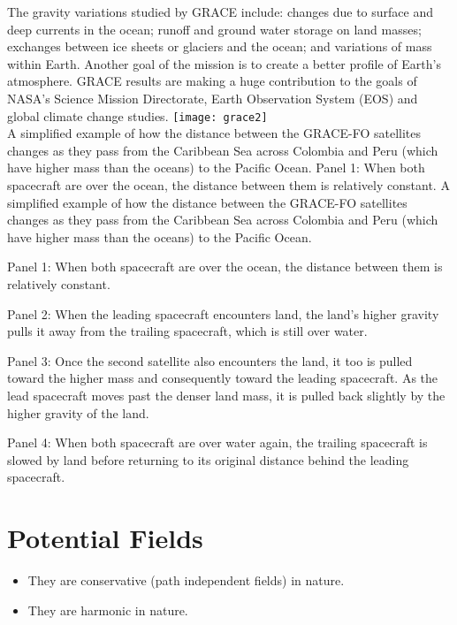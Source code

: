\documentclass[a4paper,12pt]{article}
\begin{document}
The gravity variations studied by GRACE include: changes due to surface and deep currents in the ocean; runoff and ground water storage on land masses; exchanges between ice sheets or glaciers and the ocean; and variations of mass within Earth. Another goal of the mission is to create a better profile of Earth's atmosphere. GRACE results are making a huge contribution to the goals of NASA's Science Mission Directorate, Earth Observation System (EOS) and global climate change studies.
\newpage
\texttt{[image: grace2]}
\\
A simplified example of how the distance between the GRACE-FO satellites changes as they pass from the Caribbean Sea across Colombia and Peru (which have higher mass than the oceans) to the Pacific Ocean. Panel 1: When both spacecraft are over the ocean, the distance between them is relatively constant. 
A simplified example of how the distance between the GRACE-FO satellites changes as they pass from the Caribbean Sea across Colombia and Peru (which have higher mass than the oceans) to the Pacific Ocean.

Panel 1: When both spacecraft are over the ocean, the distance between them is relatively constant.

Panel 2: When the leading spacecraft encounters land, the land's higher gravity pulls it away from the trailing spacecraft, which is still over water.

Panel 3: Once the second satellite also encounters the land, it too is pulled toward the higher mass and consequently toward the leading spacecraft. As the lead spacecraft moves past the denser land mass, it is pulled back slightly by the higher gravity of the land.

Panel 4: When both spacecraft are over water again, the trailing spacecraft is slowed by land before returning to its original distance behind the leading spacecraft.





\newpage

\section{Potential Fields}
\begin{itemize}
\item They are conservative (path independent fields) in nature.     
\item They are harmonic in nature.
\end{itemize}
\end{document}
